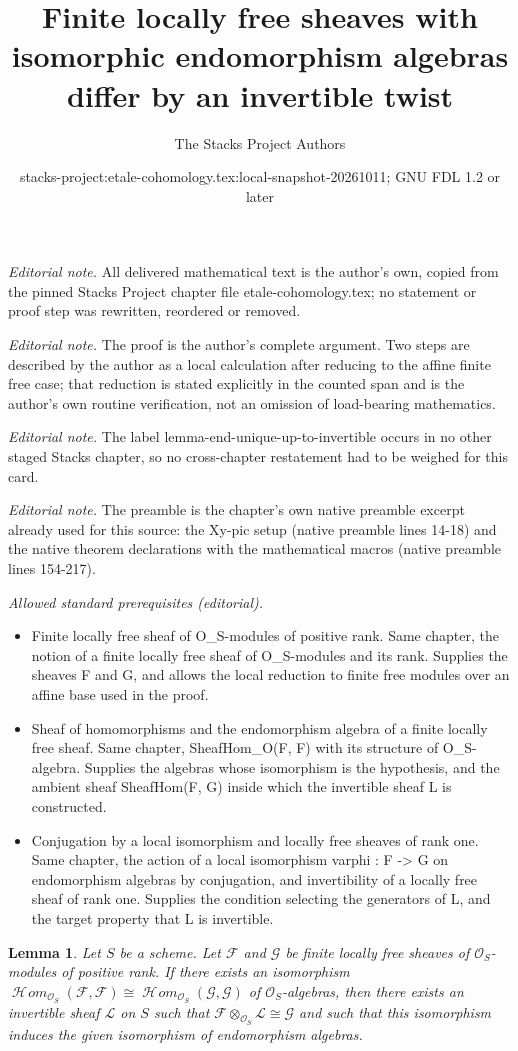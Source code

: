 \documentclass[10pt,a4paper]{amsart}
\title{Finite locally free sheaves with isomorphic endomorphism algebras differ by an invertible twist}
\author{The Stacks Project Authors}
\date{stacks-project:etale-cohomology.tex:local-snapshot-20261011; GNU FDL 1.2 or later}
\theoremstyle{plain}
\newtheorem{lemma}[subsection]{Lemma}
\theoremstyle{definition}
\theoremstyle{remark}
\numberwithin{equation}{subsection}
\def\SheafHom{\mathop{\mathcal{H}\!\mathit{om}}\nolimits}
\begin{document}
\maketitle
\noindent\textit{Editorial note.} All delivered mathematical text is the author's own, copied from the pinned Stacks Project chapter file etale-cohomology.tex; no statement or proof step was rewritten, reordered or removed.\par\medskip
\noindent\textit{Editorial note.} The proof is the author's complete argument. Two steps are described by the author as a local calculation after reducing to the affine finite free case; that reduction is stated explicitly in the counted span and is the author's own routine verification, not an omission of load-bearing mathematics.\par\medskip
\noindent\textit{Editorial note.} The label lemma-end-unique-up-to-invertible occurs in no other staged Stacks chapter, so no cross-chapter restatement had to be weighed for this card.\par\medskip
\noindent\textit{Editorial note.} The preamble is the chapter's own native preamble excerpt already used for this source: the Xy-pic setup (native preamble lines 14-18) and the native theorem declarations with the mathematical macros (native preamble lines 154-217).\par\medskip
\noindent\textit{Allowed standard prerequisites (editorial).}\begin{itemize}
\item Finite locally free sheaf of O\_S-modules of positive rank. Same chapter, the notion of a finite locally free sheaf of O\_S-modules and its rank. Supplies the sheaves F and G, and allows the local reduction to finite free modules over an affine base used in the proof.
\item Sheaf of homomorphisms and the endomorphism algebra of a finite locally free sheaf. Same chapter, SheafHom\_O(F, F) with its structure of O\_S-algebra. Supplies the algebras whose isomorphism is the hypothesis, and the ambient sheaf SheafHom(F, G) inside which the invertible sheaf L is constructed.
\item Conjugation by a local isomorphism and locally free sheaves of rank one. Same chapter, the action of a local isomorphism varphi : F -> G on endomorphism algebras by conjugation, and invertibility of a locally free sheaf of rank one. Supplies the condition selecting the generators of L, and the target property that L is invertible.
\end{itemize}\medskip
\begin{lemma}
\label{lemma-end-unique-up-to-invertible}
Let $S$ be a scheme. Let $\mathcal{F}$ and $\mathcal{G}$ be finite locally
free sheaves of $\mathcal{O}_S$-modules of positive rank. If there
exists an isomorphism
$\SheafHom_{\mathcal{O}_S}(\mathcal{F}, \mathcal{F}) \cong
\SheafHom_{\mathcal{O}_S}(\mathcal{G}, \mathcal{G})$ of
$\mathcal{O}_S$-algebras, then there exists an invertible sheaf
$\mathcal{L}$ on $S$ such that
$\mathcal{F} \otimes_{\mathcal{O}_S} \mathcal{L} \cong \mathcal{G}$
and such that this isomorphism induces the given isomorphism of
endomorphism algebras.
\end{lemma}
\end{document}

